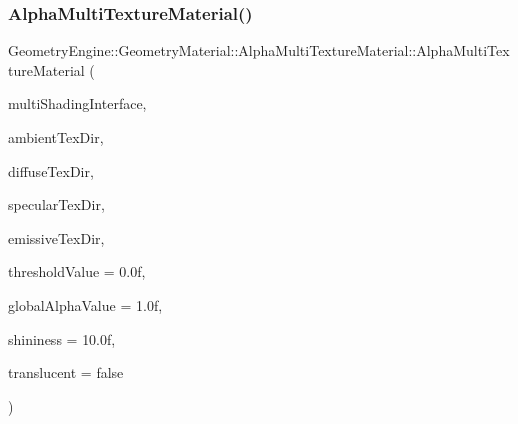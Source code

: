 \subsubsection{\texorpdfstring{AlphaMultiTextureMaterial()}{AlphaMultiTextureMaterial()}\hspace{0.1cm}{\footnotesize\ttfamily [1/3]}}
{\footnotesize\ttfamily Geometry\+Engine\+::\+Geometry\+Material\+::\+Alpha\+Multi\+Texture\+Material\+::\+Alpha\+Multi\+Texture\+Material (\begin{DoxyParamCaption}\item[{const \mbox{\hyperlink{class_geometry_engine_1_1_custom_shading_1_1_multi_shading_interface}{Custom\+Shading\+::\+Multi\+Shading\+Interface}} $\ast$const}]{multi\+Shading\+Interface,  }\item[{const std\+::string \&}]{ambient\+Tex\+Dir,  }\item[{const std\+::string \&}]{diffuse\+Tex\+Dir,  }\item[{const std\+::string \&}]{specular\+Tex\+Dir,  }\item[{const std\+::string \&}]{emissive\+Tex\+Dir,  }\item[{float}]{threshold\+Value = {\ttfamily 0.0f},  }\item[{float}]{global\+Alpha\+Value = {\ttfamily 1.0f},  }\item[{float}]{shininess = {\ttfamily 10.0f},  }\item[{bool}]{translucent = {\ttfamily false} }\end{DoxyParamCaption})}

